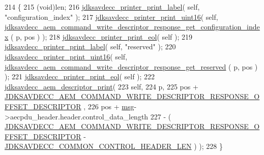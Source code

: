 \begin{DoxyCode}
214 \{
215     (void)len;
216     \hyperlink{group__util_gaf7818b24143b3c7502926a425a242ff5}{jdksavdecc\_printer\_print\_label}( \textcolor{keyword}{self}, \textcolor{stringliteral}{"configuration\_index"} );
217     \hyperlink{group__util_ga9793e0ff8e7ed25d957282ee6b257ce2}{jdksavdecc\_printer\_print\_uint16}( \textcolor{keyword}{self}, 
      \hyperlink{group__command__write__descriptor__response_ga78644abd94bda0bc1a353549ca2501b6}{jdksavdecc\_aem\_command\_write\_descriptor\_response\_get\_configuration\_index}
      ( p, pos ) );
218     \hyperlink{group__util_gacda56c9d3d24593a52c999682fa6e6e3}{jdksavdecc\_printer\_print\_eol}( \textcolor{keyword}{self} );
219     \hyperlink{group__util_gaf7818b24143b3c7502926a425a242ff5}{jdksavdecc\_printer\_print\_label}( \textcolor{keyword}{self}, \textcolor{stringliteral}{"reserved"} );
220     \hyperlink{group__util_ga9793e0ff8e7ed25d957282ee6b257ce2}{jdksavdecc\_printer\_print\_uint16}( \textcolor{keyword}{self}, 
      \hyperlink{group__command__write__descriptor__response_gaff9bbe036531fc2c8dc8731984921b78}{jdksavdecc\_aem\_command\_write\_descriptor\_response\_get\_reserved}
      ( p, pos ) );
221     \hyperlink{group__util_gacda56c9d3d24593a52c999682fa6e6e3}{jdksavdecc\_printer\_print\_eol}( \textcolor{keyword}{self} );
222     \hyperlink{group__aem__print_gadd626df0712b38901c31f452c182ee82}{jdksavdecc\_aem\_descriptor\_print}(
223         \textcolor{keyword}{self},
224         p,
225         pos + \hyperlink{group__command__write__descriptor__response_gaa05e5fe030e73aafcb3c0ae7dde8fa40}{JDKSAVDECC\_AEM\_COMMAND\_WRITE\_DESCRIPTOR\_RESPONSE\_OFFSET\_DESCRIPTOR}
      ,
226         pos + \hyperlink{maap__log__linux_8c_a0c7e58a50354c4a4d6dad428d0e47029}{msg}->aecpdu\_header.header.control\_data\_length
227         - ( \hyperlink{group__command__write__descriptor__response_gaa05e5fe030e73aafcb3c0ae7dde8fa40}{JDKSAVDECC\_AEM\_COMMAND\_WRITE\_DESCRIPTOR\_RESPONSE\_OFFSET\_DESCRIPTOR}
       - \hyperlink{group__jdksavdecc__avtp__common__control__header_gaae84052886fb1bb42f3bc5f85b741dff}{JDKSAVDECC\_COMMON\_CONTROL\_HEADER\_LEN} ) );
228 \}
\end{DoxyCode}


